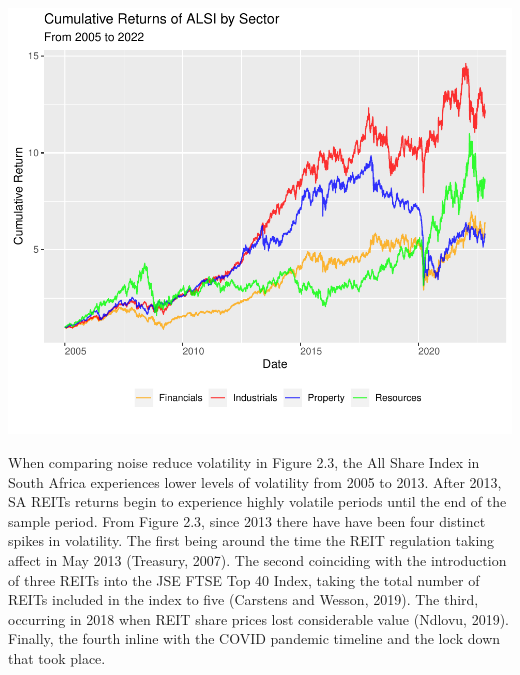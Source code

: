 \documentclass[11pt,preprint, authoryear]{elsarticle}
\let\origfigure\figure
\let\endorigfigure\endfigure
\renewenvironment{figure}[1][2] {
    \expandafter\origfigure\expandafter[H]
} {
    \endorigfigure
}
\numberwithin{equation}{section}
\numberwithin{figure}{section}
\numberwithin{table}{section}
\begin{document}
\begin{figure}
\centering
\includegraphics{Fin_Metrics_Project_files/figure-latex/unnamed-chunk-2-1.pdf}
\caption{Cumulative Returns}
\end{figure}

When comparing noise reduce volatility in Figure 2.3, the All Share
Index in South Africa experiences lower levels of volatility from 2005
to 2013. After 2013, SA REITs returns begin to experience highly
volatile periods until the end of the sample period. From Figure 2.3,
since 2013 there have have been four distinct spikes in volatility. The
first being around the time the REIT regulation taking affect in May
2013 (Treasury, 2007). The second coinciding with the introduction of
three REITs into the JSE FTSE Top 40 Index, taking the total number of
REITs included in the index to five (Carstens and Wesson, 2019). The
third, occurring in 2018 when REIT share prices lost considerable value
(Ndlovu, 2019). Finally, the fourth inline with the COVID pandemic
timeline and the lock down that took place.
\end{document}
